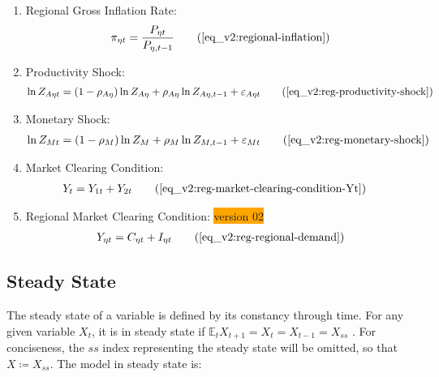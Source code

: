 \documentclass[../thesis.tex]{subfiles}
\begin{document}
{\begin{itemize}
\begin{enumerate}
		\item Regional Gross Inflation Rate:
		\begin{align}
			\pi_{\eta t} = \frac{P_{\eta t}}{P_{\eta, t-1}} \tag{\ref{eq_v2:regional-inflation}}
		\end{align}
		
		\item Productivity Shock:
		\begin{align}
			\ln{Z_{A\eta t}} = (1-\rho_{A\eta})\ln{Z_{A\eta}} + \rho_{A\eta}\ln{Z_{A\eta,t-1}} + \varepsilon_{A\eta t} \tag{\ref{eq_v2:reg-productivity-shock}}
		\end{align}
		
		\item Monetary Shock:
		\begin{align}
			\ln{Z_{Mt}} = (1-\rho_M)\ln{Z_{M}} + \rho_M\ln{Z_{M,t-1}} + \varepsilon_{Mt} \tag{\ref{eq_v2:reg-monetary-shock}}
		\end{align}

		\item Market Clearing Condition:
		\begin{align}
			Y_{t} &= Y_{1 t} + Y_{2 t} \tag{\ref{eq_v2:reg-market-clearing-condition-Yt}}
		\end{align}

		\item Regional Market Clearing Condition: \colorbox{orange}{version 02}
		\begin{align}
			Y_{\eta t} = C_{\eta t} + I_{\eta t} \tag{\ref{eq_v2:reg-regional-demand}}
		\end{align}
						
		\end{enumerate}
		
	\end{itemize}
	
} %



\subsection{Steady State}

The steady state of a variable is defined by its constancy through time. For any given variable $X_t$, it is in steady state if $\mathbb{E}_t X_{t+1} = X_t = X_{t-1} = X_{ss}$ \cite[p.41]{costa_junior_understanding_2016}. For conciseness, the $ss$ index representing the steady state will be omitted, so that $X \coloneq X_{ss}$. The model in steady state is:
\end{document}
